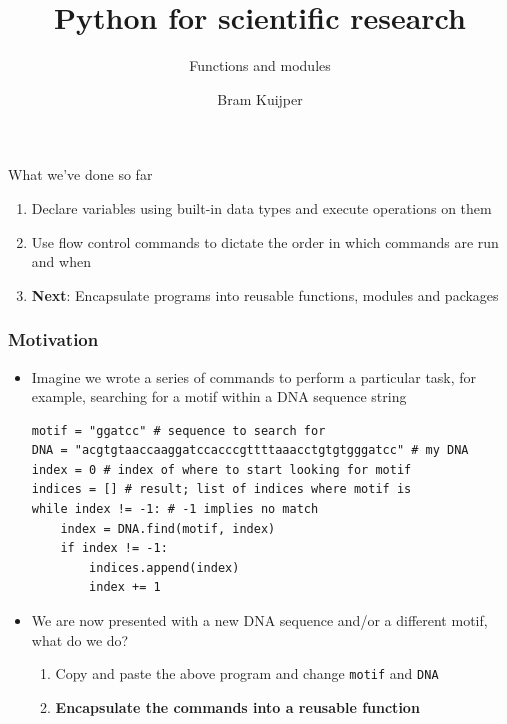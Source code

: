 \documentclass[xcolor=table]{beamer}
\title[Python for scientific research]{Python for scientific research}
\subtitle{Functions and modules}
\author{Bram Kuijper}
\institute[]{University of Exeter, Penryn Campus, UK}
\begin{document}
\begin{frame}
\titlepage
\end{frame}

\begin{frame}{What we've done so far}

	\begin{enumerate}\addtolength{\itemsep}{1\baselineskip}
		\item Declare variables using built-in data types and execute operations
		on them
		\item Use flow control commands to dictate the order in which commands are run
		and when
		\item \textbf{Next}: Encapsulate programs into reusable functions, modules and packages
	\end{enumerate}

\end{frame}

\begin{frame}[fragile]
\frametitle{Motivation}

\begin{itemize}\addtolength{\itemsep}{-1\baselineskip}
	\item<1-> Imagine we wrote a series of commands to perform a particular task, for example,
	searching for a motif within a DNA sequence string 

\begin{lstlisting}[style=python]
motif = "ggatcc" # sequence to search for
DNA = "acgtgtaaccaaggatccacccgttttaaacctgtgtgggatcc" # my DNA
index = 0 # index of where to start looking for motif
indices = [] # result; list of indices where motif is
while index != -1: # -1 implies no match
    index = DNA.find(motif, index)
    if index != -1:
        indices.append(index)
        index += 1
\end{lstlisting}

	\item <2-> We are now presented with a new DNA sequence and/or a different motif, what do we do? 
	\begin{enumerate}\addtolength{\itemsep}{0.5\baselineskip}
		\item<2-> Copy and paste the above program and change \texttt{motif} and \texttt{DNA}
		\item<3-> \textbf{Encapsulate the commands into a reusable function}
	\end{enumerate}

\end{itemize}

\end{frame}
\end{document}

